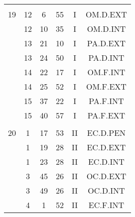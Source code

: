 \documentclass[12pt, a4paper]{article}
\begin{document}
\begin{multicols}{3}
{\begin{tabular}{c c c c c c}
	 	 	 	 & & & & & \\%
	 	 	 	19 & 12 & 6 & 55 & I & OM.D.EXT\\%
	 	 	 	 & 12 & 10 & 35 & I & OM.D.INT\\%
	 	 	 	 & 13 & 21 & 10 & I & PA.D.EXT\\%
	 	 	 	 & 13 & 24 & 50 & I & PA.D.INT\\%
	 	 	 	 & 14 & 22 & 17 & I & OM.F.INT\\%
	 	 	 	 & 14 & 25 & 52 & I & OM.F.EXT\\%
	 	 	 	 & 15 & 37 & 22 & I & PA.F.INT\\%
	 	 	 	 & 15 & 40 & 57 & I & PA.F.EXT\\%
	 	 	 	 & & & & & \\%
	 	 	 	20 & 1 & 17 & 53 & II & EC.D.PEN\\%
	 	 	 	 & 1 & 19 & 28 & II & EC.D.EXT\\%
	 	 	 	 & 1 & 23 & 28 & II & EC.D.INT\\%
	 	 	 	 & 3 & 45 & 26 & II & OC.D.EXT\\%
	 	 	 	 & 3 & 49 & 26 & II & OC.D.INT\\%
	 	 	 	 & 4 & 1 & 52 & II & EC.F.INT\\%
	 	 \end{tabular}
 	}
\end{multicols}
\end{document}
